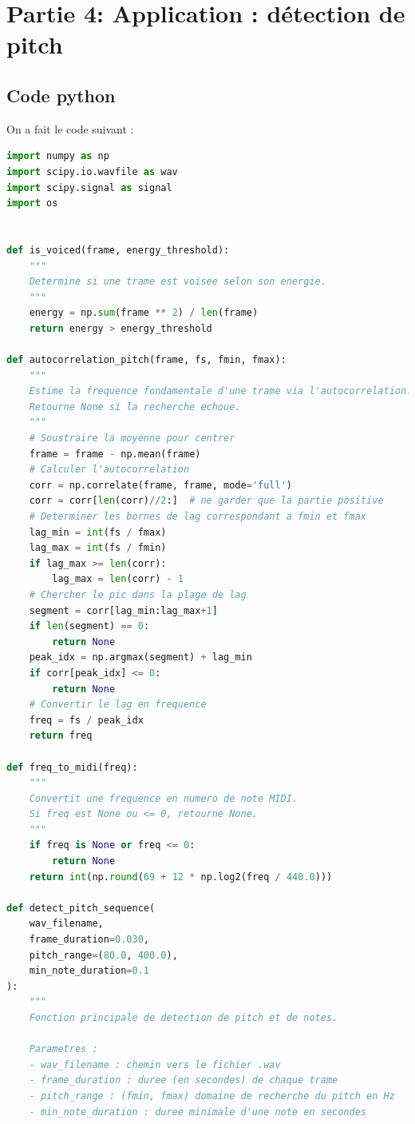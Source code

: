 \newpage
\section{Partie 4: Application : détection de pitch}
\subsection{Code python}
On a fait le code suivant :

\begin{lstlisting}[language=python]
    import numpy as np
import scipy.io.wavfile as wav
import scipy.signal as signal
import os


def is_voiced(frame, energy_threshold):
    """
    Determine si une trame est voisee selon son energie.
    """
    energy = np.sum(frame ** 2) / len(frame)
    return energy > energy_threshold

def autocorrelation_pitch(frame, fs, fmin, fmax):
    """
    Estime la frequence fondamentale d'une trame via l'autocorrelation.
    Retourne None si la recherche echoue.
    """
    # Soustraire la moyenne pour centrer
    frame = frame - np.mean(frame)
    # Calculer l'autocorrelation
    corr = np.correlate(frame, frame, mode='full')
    corr = corr[len(corr)//2:]  # ne garder que la partie positive
    # Determiner les bornes de lag correspondant a fmin et fmax
    lag_min = int(fs / fmax)
    lag_max = int(fs / fmin)
    if lag_max >= len(corr):
        lag_max = len(corr) - 1
    # Chercher le pic dans la plage de lag
    segment = corr[lag_min:lag_max+1]
    if len(segment) == 0:
        return None
    peak_idx = np.argmax(segment) + lag_min
    if corr[peak_idx] <= 0:
        return None
    # Convertir le lag en frequence
    freq = fs / peak_idx
    return freq

def freq_to_midi(freq):
    """
    Convertit une frequence en numero de note MIDI.
    Si freq est None ou <= 0, retourne None.
    """
    if freq is None or freq <= 0:
        return None
    return int(np.round(69 + 12 * np.log2(freq / 440.0)))

def detect_pitch_sequence(
    wav_filename,
    frame_duration=0.030,
    pitch_range=(80.0, 400.0),
    min_note_duration=0.1
):
    """
    Fonction principale de detection de pitch et de notes.

    Parametres :
    - wav_filename : chemin vers le fichier .wav
    - frame_duration : duree (en secondes) de chaque trame
    - pitch_range : (fmin, fmax) domaine de recherche du pitch en Hz
    - min_note_duration : duree minimale d'une note en secondes


\end{lstlisting}

